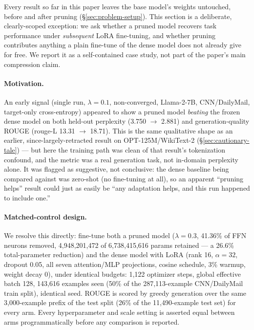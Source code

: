 \documentclass[11pt]{article}
\begin{document}
Every result so far in this paper leaves the base model's weights untouched,
before and after pruning (\S\ref{sec:problem-setup}). This section is a
deliberate, clearly-scoped exception: we ask whether a pruned model recovers
task performance under \emph{subsequent} LoRA fine-tuning, and whether
pruning contributes anything a plain fine-tune of the dense model does not
already give for free. We report it as a self-contained case study, not part
of the paper's main compression claim.

\paragraph{Motivation.} An early signal (single run, $\lambda=0.1$,
non-converged, Llama-2-7B, CNN/DailyMail, target-only cross-entropy)
appeared to show a pruned model \emph{beating} the frozen dense model on
both held-out perplexity (3.750 $\to$ 2.881) and generation-quality ROUGE
(rouge-L 13.31 $\to$ 18.71). This is the same qualitative shape as an
earlier, since-largely-retracted result on OPT-125M/WikiText-2
(\S\ref{sec:cautionary-tale}) --- but here the training path was clean of
that result's tokenization confound, and the metric was a real generation
task, not in-domain perplexity alone. It was flagged as suggestive, not
conclusive: the dense baseline being compared against was zero-shot (no
fine-tuning at all), so an apparent ``pruning helps'' result could just as
easily be ``any adaptation helps, and this run happened to include one.''

\paragraph{Matched-control design.} We resolve this directly: fine-tune both
a pruned model ($\lambda=0.3$, 41.36\% of FFN neurons removed,
4{,}948{,}201{,}472 of 6{,}738{,}415{,}616 params retained --- a 26.6\%
total-parameter reduction) and the dense model with LoRA (rank 16,
$\alpha=32$, dropout 0.05, all seven attention/MLP projections, cosine
schedule, 3\% warmup, weight decay 0), under identical budgets: 1{,}122
optimizer steps, global effective batch 128, 143{,}616 examples seen (50\%
of the 287{,}113-example CNN/DailyMail train split), identical seed. ROUGE
is scored by greedy generation over the same 3{,}000-example prefix of the
test split (26\% of the 11{,}490-example test set) for every arm. Every
hyperparameter and scale setting is asserted equal between arms
programmatically before any comparison is reported.
\end{document}
